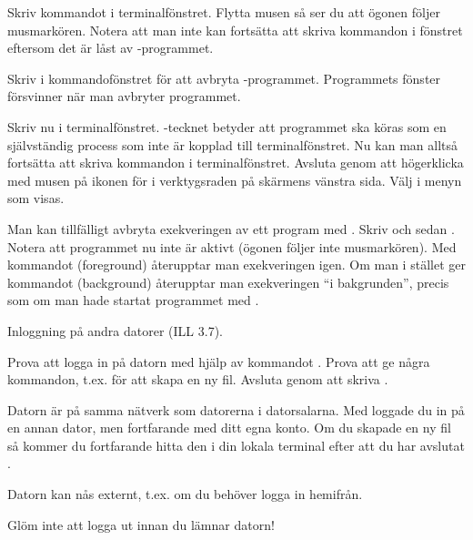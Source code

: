 \begin{Datorarbete}
\begin{Deluppgifter}
\item Skriv kommandot  i terminalfönstret. Flytta musen så ser du att ögonen följer musmarkören. Notera att man inte kan fortsätta att skriva kommandon i fönstret eftersom det är låst av -programmet.
\item Skriv  i kommandofönstret för att avbryta -programmet. Programmets fönster försvinner när man avbryter programmet.
\item Skriv nu  i terminalfönstret. \code{\&}-tecknet betyder att programmet ska köras som en självständig process som inte är kopplad till terminalfönstret. Nu kan man alltså fortsätta att skriva kommandon i terminalfönstret. Avsluta  genom att högerklicka med musen på ikonen för  i verktygsraden på skärmens vänstra sida. Välj  i menyn som visas.
\item Man kan tillfälligt avbryta exekveringen av ett program med . Skriv  och sedan . Notera att programmet nu inte är aktivt (ögonen följer inte musmarkören). Med kommandot  (foreground) återupptar man exekveringen igen. Om man i stället ger kommandot  (background) återupptar man exekveringen \enquote{i bakgrunden}, precis som om man hade startat programmet med .
\end{Deluppgifter}

\item Inloggning på andra datorer (ILL 3.7).

\begin{Deluppgifter}
\item Prova att logga in på datorn  med hjälp av kommandot . Prova att ge några kommandon, t.ex.  för att skapa en ny fil. Avsluta genom att skriva .
\item Datorn  är på samma nätverk som datorerna i datorsalarna. Med  loggade du in på en annan dator, men fortfarande med ditt egna konto. Om du skapade en ny fil så kommer du fortfarande hitta den i din lokala terminal efter att du har avslutat .
\item Datorn  kan nås externt, t.ex. om du behöver logga in hemifrån.
\end{Deluppgifter}

\item Glöm inte att logga ut innan du lämnar datorn!

\end{Datorarbete}
